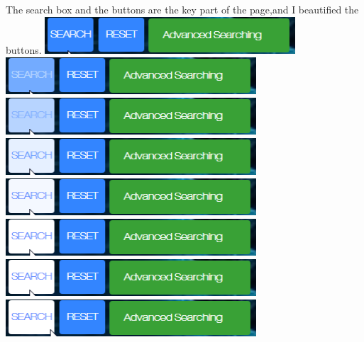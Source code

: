 \documentclass[10pt,twoside,a4paper,titlepage]{article}
\begin{document}
	The search box and the buttons are the key part of the page,and I beautified the buttons.
	\newline
	\newline
	\includegraphics[width=0.7\textwidth]{cyf/search1.png}
	\newline
	\includegraphics[width=0.7\textwidth]{cyf/search2.png}
	\newline
 	\includegraphics[width=0.7\textwidth]{cyf/search3.png}
 	\newline	
 	\includegraphics[width=0.7\textwidth]{cyf/search4.png}
 	\newline	\includegraphics[width=0.7\textwidth]{cyf/search5.png}
 	\newline	\includegraphics[width=0.7\textwidth]{cyf/search6.png}
 	\newline	\includegraphics[width=0.7\textwidth]{cyf/search7.png}
 	\newline
	\includegraphics[width=0.7\textwidth]{cyf/reset1.png}
	\newline
\end{document}
